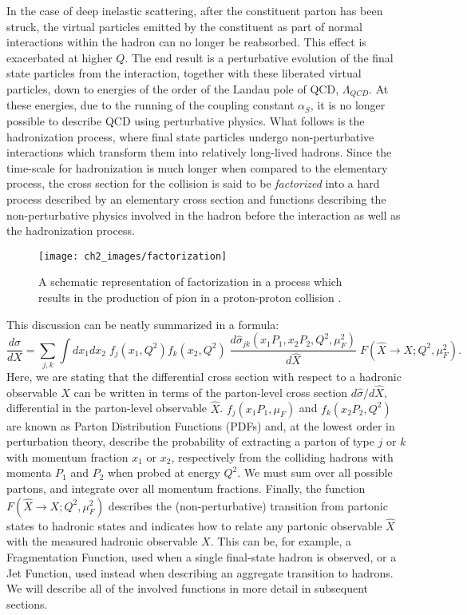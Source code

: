\documentclass[10pt,a4paper]{book}
\begin{document}
In the case of deep inelastic scattering, after the constituent parton has been struck, the virtual particles emitted by the constituent as part of normal interactions within the hadron can no longer be reabsorbed. This effect is exacerbated at higher $Q$. The end result is a perturbative evolution of the final state particles from the interaction, together with these liberated virtual particles, down to energies of the order of the Landau pole of QCD, $\Lambda_{QCD}$. At these energies, due to the running of the coupling constant $\alpha_S$, it is no longer possible to describe QCD using perturbative physics. What follows is the hadronization process, where final state particles undergo non-perturbative interactions which transform them into relatively long-lived hadrons. Since the time-scale for hadronization is much longer when compared to the elementary process, the cross section for the collision is said to be \emph{factorized} into a hard process described by an elementary cross section and functions describing the non-perturbative physics involved in the hadron before the interaction as well as the hadronization process. 


\begin{figure}[h]
\centering
\texttt{[image: ch2\_images/factorization]}
\caption{A schematic representation of factorization in a process which results in the production of pion in a proton-proton collision \cite{Soffer}.}
\label{factorization pion}
\end{figure}

This discussion can be neatly summarized in a formula:
\begin{equation}
\frac{d\sigma}{dX} = \sum_{j,k} \int dx_1 dx_2 \; f_j(x_1, Q^2)f_k(x_2, Q^2) \; \frac{d\hat{\sigma}_{jk}(x_1P_1, x_2P_2, Q^2, \mu_F^2)}{d\hat{X}} \; F(\hat{X}\rightarrow X; Q^2, \mu_F^2).
\label{master formula}
\end{equation}
Here, we are stating that the differential cross section with respect to a hadronic observable $X$ can be written in terms of the parton-level cross section $d\hat{\sigma}/d\hat{X}$, differential in the parton-level observable $\hat{X}$. $f_j(x_1P_1, \mu_F)$ and $f_k(x_2P_2, Q^2)$ are known as Parton Distribution Functions (PDFs) and, at the lowest order in perturbation theory, describe the probability of extracting a parton of type $j$ or $k$ with momentum fraction $x_1$ or $x_2$, respectively from the colliding hadrons with momenta $P_1$ and $P_2$ when probed at energy $Q^2$. We must sum over all possible partons, and integrate over all momentum fractions. Finally, the function $F(\hat{X}\rightarrow X; Q^2, \mu_F^2)$ describes the (non-perturbative) transition from partonic states to hadronic states and indicates how to relate any partonic observable $\hat{X}$ with the measured hadronic observable $X$. This can be, for example, a Fragmentation Function, used when a single final-state hadron is observed, or a Jet Function, used instead when describing an aggregate transition to hadrons. We will describe all of the involved functions in more detail in subsequent sections. 
\end{document}
